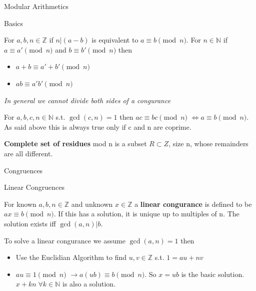 \documentclass[12pt, letterpaper]{article}
\begin{document}
\begin{section}{Modular Arithmetics}

  \begin{subsection}{Basics}

    For \(a, b, n \in \mathbb{Z}\) if \(n | (a - b)\) is equivalent to
    \(a \equiv b \pmod{n}\). For \(n \in \mathbb{N}\) if \(a \equiv a' \pmod{n}\)
    and \(b \equiv b' \pmod{n}\) then
    \begin{itemize}
      \item \(a + b \equiv a' + b' \pmod{n}\)
      \item \(ab \equiv a'b' \pmod{n}\)
    \end{itemize}

    \emph{In general we cannot divide both sides of a congurance}

    For \(a, b, c, n \in \mathbb{N}\) s.t. \(\gcd(c, n) = 1\) then
    \(ac \equiv bc \pmod{n}\) \(\iff a \equiv b \pmod{n}\).
    As said above this is always true only if c and n are coprime.

    \textbf{Complete set of residues} mod n is a subset \(R \subset Z\), size n,
    whose remainders are all different.

  \end{subsection}

  \begin{subsection}{Congruences}

    \begin{subsubsection}{Linear Congruences}

      For known \(a, b, n \in \mathbb{Z}\) and unknown \(x \in \mathbb{Z}\)
      a \textbf{linear congurance} is defined to be \(ax \equiv b \pmod{n}\). If this
      has a solution, it is unique up to multiples of n. The solution exists iff
      \(\gcd(a, n) | b\).

      To solve a linear congurance we assume \(\gcd(a, n) = 1\) then
      \begin{itemize}
        \item Use the Euclidian Algorithm to find \(u, v \in \mathbb{Z}\) s.t.
              \(1 = au + nv\)
        \item \(au \equiv 1 \pmod{n}\) \(\to a(ub) \equiv b \pmod{n}\).
              So \(x = ub\) is the basic solution. \(x + kn \; \forall k \in \mathbb{N}\)
              is also a solution.
      \end{itemize}

    \end{subsubsection}


\end{subsection}
\end{section}
\end{document}
